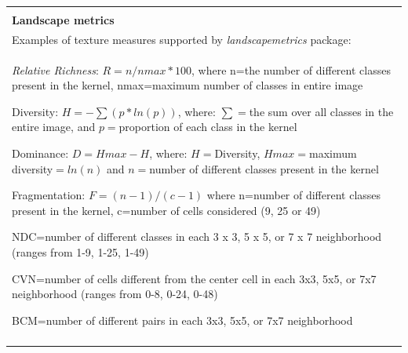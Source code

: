 \documentclass[12pt]{article}
\newenvironment{boxed}
{\begin{center}
		\begin{tabular}{|p{0.9\textwidth}|}
			\hline\\
		}
		{ 
			\\\\\hline
		\end{tabular} 
	\end{center}
}
\begin{document}
\begin{boxed}

\textbf{Landscape metrics}

\\

Examples of texture measures supported by \textit{landscapemetrics} package:

\\



\textit{ Relative Richness}: $R=n/nmax*100$, where n=the number of different classes present in the kernel, nmax=maximum number of classes in entire image

Diversity: $H=-\sum(p*ln(p))$, where: $\sum=$the sum over all classes in the entire image, and $p=$proportion of each class in the kernel

Dominance: $D=Hmax-H$, where: $H=$Diversity, $Hmax=$maximum diversity$=ln(n)$ and $n=$number of different classes present in the kernel

Fragmentation: $F=(n-1)/(c-1)$ where n=number of different classes present in the kernel, c=number of cells considered (9, 25 or 49)

NDC=number of different classes in each 3 x 3, 5 x 5, or 7 x 7 neighborhood (ranges from 1-9, 1-25, 1-49)

CVN=number of cells different from the center cell in each 3x3, 5x5, or 7x7 neighborhood (ranges from 0-8, 0-24, 0-48)

BCM=number of different pairs in each 3x3, 5x5, or 7x7 neighborhood


\end{boxed}


\end{document}
